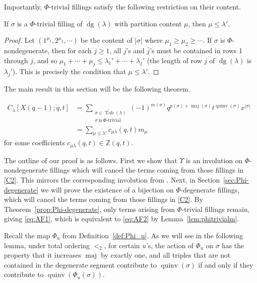 \documentclass[ALCO,Unicode]{cedram}
\DeclareMathOperator{\PQT}{Tab}
\DeclareMathOperator{\dg}{dg}
\DeclareMathOperator{\maj}{maj}
\DeclareMathOperator{\quinv}{quinv}
\begin{document}
Importantly, $\Phi$-trivial fillings satisfy the following restriction on their content.

\begin{lemma}\label{lem:phitrivialm}
If $\sigma$ is a $\Phi$-trivial filling of $\dg(\lambda)$ with partition content $\mu$, then $\mu \leq \lambda'$.
\end{lemma}

\begin{proof}
Let $(1^{\mu_1},2^ {\mu_2},\cdots)$ be the content of $|\sigma|$ where $\mu_1\geq \mu_2\geq \cdots$. If $\sigma$ is $\Phi$-nondegenerate, then for each $j \geq 1$, all $j$'s and $\bar{j}$'s must be contained in rows 1 through $j$, and so $\mu_1+\cdots+\mu_j \leq \lambda_1'+\cdots+\lambda_j'$ (the length of row $j$ of $\dg(\lambda)$ is $\lambda_j'$). This is precisely the condition that $\mu\leq \lambda'$.
\end{proof}


The main result in this section will be the following theorem.

\begin{theorem}\label{thm:A2FP}
\begin{align}
C_{\lambda}[X(q-1);q,t]& = \sum_{\substack{\sigma\in\widetilde{\PQT}(\lambda)\\\sigma\ \text{is}\ \Phi\text{-trivial}}} (-1)^{m(\sigma)} q^{p(\sigma)+\maj(\sigma)}t^{\quinv(\sigma)}x^{|\sigma|}\label{eq:AF1}\\
&=\sum_{\mu \leq \lambda'} c_{\mu\lambda}(q,t)m_{\mu}\label{eq:AF2}
\end{align}
for some coefficients $c_{\mu\lambda}(q,t)\in\mathbb{Z}(q,t)$.
\end{theorem}

The outline of our proof is as follows. First we show that $\Upsilon$ is an involution on $\Phi$-nondegenerate fillings which will cancel the terms coming from those fillings in \eqref{C2}. This mirrors the corresponding involution from \cite[Section 5.2]{HHL05}. Next, in Section~\ref{sec:Phi-degenerate} we will prove the existence of a bijection on $\Phi$-degenerate fillings, which will cancel the terms coming from those fillings in \eqref{C2}. By Theorem~\ref{prop:Phi-degenerate}, only terms arising from $\Phi$-trivial fillings remain, giving \eqref{eq:AF1}, which is equivalent to \eqref{eq:AF2} by Lemma~\ref{lem:phitrivialm}.

Recall the map $\Phi_u$ from Definition~\ref{def:Phi_u}. As we will see in the following lemma, under total ordering $<_2$, for certain $u$'s, the action of $\Phi_u$ on $\sigma$ has the property that it increases $\maj$ by exactly one, and all triples that are not contained in the degenerate segment contribute to $\quinv(\sigma)$ if and only if they contribute to $\quinv(\Phi_u(\sigma))$.
\end{document}
